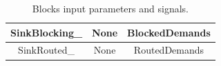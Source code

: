 \begin{table}[H]
\begin{tabular}{|c|c|c|}
		SinkBlocking\_                                                         & None                                                                                                                       & BlockedDemands                                                               \\ \hline
		SinkRouted\_                                                           & None                                                                                                                       & RoutedDemands                                                                \\ \hline
	\end{tabular}
	\caption{Blocks input parameters and signals.}
	\label{blocks_input}
\end{table}

